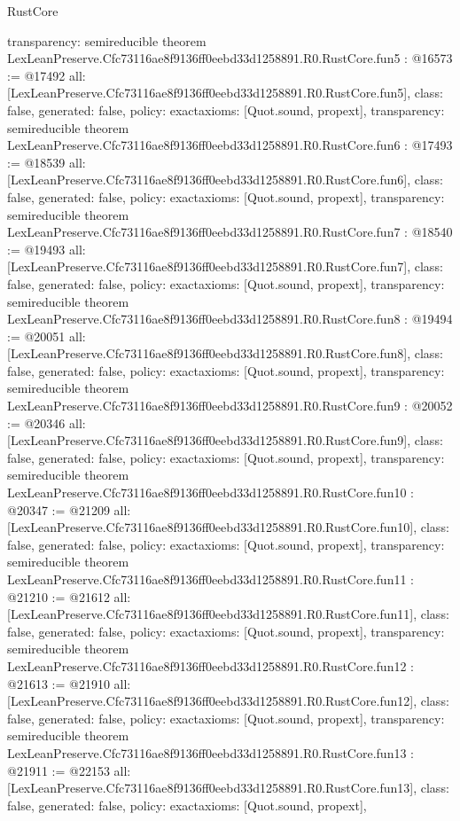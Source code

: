 \begin{lexlean}{RustCore}
\begin{coremodule}
{  transparency: semireducible
}
theorem LexLeanPreserve.Cfc73116ae8f9136ff0eebd33d1258891.R0.RustCore.fun5 : @16573 := @17492 {
  all: [LexLeanPreserve.Cfc73116ae8f9136ff0eebd33d1258891.R0.RustCore.fun5],
  class: false,
  generated: false,
  policy: exact{axioms: [Quot.sound, propext]},
  transparency: semireducible
}
theorem LexLeanPreserve.Cfc73116ae8f9136ff0eebd33d1258891.R0.RustCore.fun6 : @17493 := @18539 {
  all: [LexLeanPreserve.Cfc73116ae8f9136ff0eebd33d1258891.R0.RustCore.fun6],
  class: false,
  generated: false,
  policy: exact{axioms: [Quot.sound, propext]},
  transparency: semireducible
}
theorem LexLeanPreserve.Cfc73116ae8f9136ff0eebd33d1258891.R0.RustCore.fun7 : @18540 := @19493 {
  all: [LexLeanPreserve.Cfc73116ae8f9136ff0eebd33d1258891.R0.RustCore.fun7],
  class: false,
  generated: false,
  policy: exact{axioms: [Quot.sound, propext]},
  transparency: semireducible
}
theorem LexLeanPreserve.Cfc73116ae8f9136ff0eebd33d1258891.R0.RustCore.fun8 : @19494 := @20051 {
  all: [LexLeanPreserve.Cfc73116ae8f9136ff0eebd33d1258891.R0.RustCore.fun8],
  class: false,
  generated: false,
  policy: exact{axioms: [Quot.sound, propext]},
  transparency: semireducible
}
theorem LexLeanPreserve.Cfc73116ae8f9136ff0eebd33d1258891.R0.RustCore.fun9 : @20052 := @20346 {
  all: [LexLeanPreserve.Cfc73116ae8f9136ff0eebd33d1258891.R0.RustCore.fun9],
  class: false,
  generated: false,
  policy: exact{axioms: [Quot.sound, propext]},
  transparency: semireducible
}
theorem LexLeanPreserve.Cfc73116ae8f9136ff0eebd33d1258891.R0.RustCore.fun10 : @20347 := @21209 {
  all: [LexLeanPreserve.Cfc73116ae8f9136ff0eebd33d1258891.R0.RustCore.fun10],
  class: false,
  generated: false,
  policy: exact{axioms: [Quot.sound, propext]},
  transparency: semireducible
}
theorem LexLeanPreserve.Cfc73116ae8f9136ff0eebd33d1258891.R0.RustCore.fun11 : @21210 := @21612 {
  all: [LexLeanPreserve.Cfc73116ae8f9136ff0eebd33d1258891.R0.RustCore.fun11],
  class: false,
  generated: false,
  policy: exact{axioms: [Quot.sound, propext]},
  transparency: semireducible
}
theorem LexLeanPreserve.Cfc73116ae8f9136ff0eebd33d1258891.R0.RustCore.fun12 : @21613 := @21910 {
  all: [LexLeanPreserve.Cfc73116ae8f9136ff0eebd33d1258891.R0.RustCore.fun12],
  class: false,
  generated: false,
  policy: exact{axioms: [Quot.sound, propext]},
  transparency: semireducible
}
theorem LexLeanPreserve.Cfc73116ae8f9136ff0eebd33d1258891.R0.RustCore.fun13 : @21911 := @22153 {
  all: [LexLeanPreserve.Cfc73116ae8f9136ff0eebd33d1258891.R0.RustCore.fun13],
  class: false,
  generated: false,
  policy: exact{axioms: [Quot.sound, propext]},
}
\end{coremodule}
\end{lexlean}
